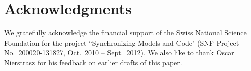 \documentclass[runningheads]{llncs}
\begin{document}
\section*{Acknowledgments}

\small We gratefully acknowledge the financial support of the Swiss National Science Foundation for the project ``Synchronizing Models and Code" (SNF Project No.\ 200020-131827, Oct.\ 2010 -- Sept.\ 2012). We also like to thank Oscar Nierstrasz for his feedback on earlier drafts of this paper.



\end{document}
